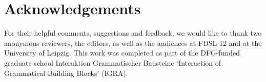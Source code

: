 \documentclass[output=paper,modfonts,newtxmath,hidelinks]{langscibook}
\begin{document}
\section*{Acknowledgements}
For their helpful comments, suggestions and feedback, we would like to thank two anonymous reviewers, the editors, as well as the audiences at FDSL 12 and at the University of Leipzig. This work was completed as part of the DFG-funded graduate school Interaktion Grammatischer Bausteine `Interaction of Grammatical Building Blocks' (IGRA).

\sloppy
\printbibliography[heading=subbibliography,notkeyword=this]
\end{document}
